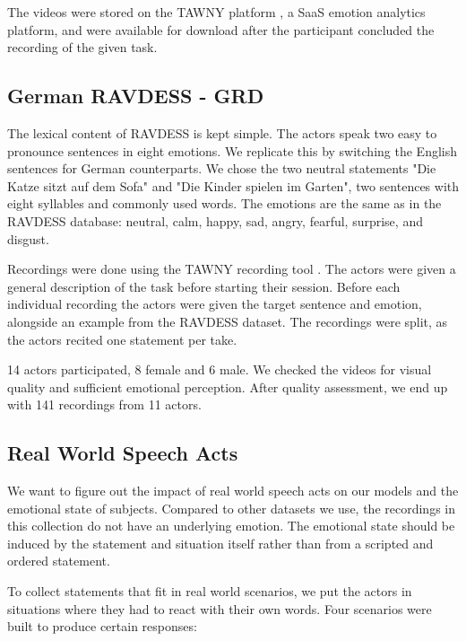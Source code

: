 The videos were stored on the TAWNY platform \cite{tawny2021platform}, a SaaS emotion analytics platform, and were available for download after the participant concluded the recording of the given task.

\subsection{German RAVDESS - GRD}
\label{sec:german}

The lexical content of RAVDESS is kept simple. The actors speak two easy to pronounce sentences in eight emotions. We replicate this by switching the English sentences for German counterparts. We chose the two neutral statements "Die Katze sitzt auf dem Sofa" and "Die Kinder spielen im Garten", two sentences with eight syllables and commonly used words. The emotions are the same as in the RAVDESS database: neutral, calm, happy, sad, angry, fearful, surprise, and disgust.

Recordings were done using the TAWNY recording tool \cite{tawny2021}. The actors were given a general description of the task before starting their session. Before each individual recording the actors were given the target sentence and emotion, alongside an example from the RAVDESS dataset. The recordings were split, as the actors recited one statement per take. 

14 actors participated, 8 female and 6 male. We checked the videos for visual quality and sufficient emotional perception. After quality assessment, we end up with 141 recordings from 11 actors.

\subsection{Real World Speech Acts}
\label{sec:rwsa}
We want to figure out the impact of real world speech acts on our models and the emotional state of subjects. Compared to other datasets we use, the recordings in this collection do not have an underlying emotion. The emotional state should be induced by the statement and situation itself rather than from a scripted and ordered statement.

To collect statements that fit in real world scenarios, we put the actors in situations where they had to react with their own words. Four scenarios were built to produce certain responses:

